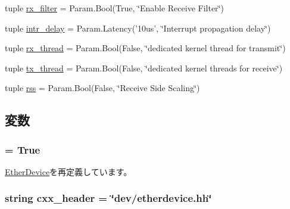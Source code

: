 \begin{DoxyCompactItemize}
\item 
tuple \hyperlink{classEthernet_1_1EtherDevBase_a45dfef9461f63f6c247eec19501795af}{rx\_\-filter} = Param.Bool(True, \char`\"{}Enable Receive Filter\char`\"{})
\item 
tuple \hyperlink{classEthernet_1_1EtherDevBase_ada0270f07afebf847f93584de622ea06}{intr\_\-delay} = Param.Latency('10us', \char`\"{}Interrupt propagation delay\char`\"{})
\item 
tuple \hyperlink{classEthernet_1_1EtherDevBase_aefe87c7b07351d14e344d05f9f8b032d}{rx\_\-thread} = Param.Bool(False, \char`\"{}dedicated kernel thread for transmit\char`\"{})
\item 
tuple \hyperlink{classEthernet_1_1EtherDevBase_a760c350751ad51c9c6631ee83d0d49b2}{tx\_\-thread} = Param.Bool(False, \char`\"{}dedicated kernel threads for receive\char`\"{})
\item 
tuple \hyperlink{classEthernet_1_1EtherDevBase_af2015635a2dcdded8ab49040988fe57e}{rss} = Param.Bool(False, \char`\"{}Receive Side Scaling\char`\"{})
\end{DoxyCompactItemize}


\subsection{変数}
\hypertarget{classEthernet_1_1EtherDevBase_a17fa61ac3806b481cafee5593b55e5d0}{
\subsubsection[{abstract}]{ = True}}
\label{classEthernet_1_1EtherDevBase_a17fa61ac3806b481cafee5593b55e5d0}


\hyperlink{classEthernet_1_1EtherDevice_a17fa61ac3806b481cafee5593b55e5d0}{EtherDevice}を再定義しています。\hypertarget{classEthernet_1_1EtherDevBase_a17da7064bc5c518791f0c891eff05fda}{
\subsubsection[{cxx\_\-header}]{\setlength{\rightskip}{0pt plus 5cm}string {\bf cxx\_\-header} = \char`\"{}dev/etherdevice.hh\char`\"{}}}
\label{classEthernet_1_1EtherDevBase_a17da7064bc5c518791f0c891eff05fda}


